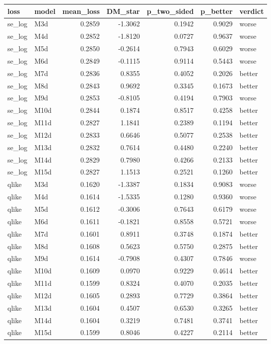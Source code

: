 \begin{tabular}{llrrrrl}
\toprule
loss & model & mean_loss & DM_star & p_two_sided & p_better & verdict \\
\midrule
se_log & M3d & 0.2859 & -1.3062 & 0.1942 & 0.9029 & worse \\
se_log & M4d & 0.2852 & -1.8120 & 0.0727 & 0.9637 & worse \\
se_log & M5d & 0.2850 & -0.2614 & 0.7943 & 0.6029 & worse \\
se_log & M6d & 0.2849 & -0.1115 & 0.9114 & 0.5443 & worse \\
se_log & M7d & 0.2836 & 0.8355 & 0.4052 & 0.2026 & better \\
se_log & M8d & 0.2843 & 0.9692 & 0.3345 & 0.1673 & better \\
se_log & M9d & 0.2853 & -0.8105 & 0.4194 & 0.7903 & worse \\
se_log & M10d & 0.2844 & 0.1874 & 0.8517 & 0.4258 & better \\
se_log & M11d & 0.2827 & 1.1841 & 0.2389 & 0.1194 & better \\
se_log & M12d & 0.2833 & 0.6646 & 0.5077 & 0.2538 & better \\
se_log & M13d & 0.2832 & 0.7614 & 0.4480 & 0.2240 & better \\
se_log & M14d & 0.2829 & 0.7980 & 0.4266 & 0.2133 & better \\
se_log & M15d & 0.2827 & 1.1513 & 0.2521 & 0.1260 & better \\
qlike & M3d & 0.1620 & -1.3387 & 0.1834 & 0.9083 & worse \\
qlike & M4d & 0.1614 & -1.5335 & 0.1280 & 0.9360 & worse \\
qlike & M5d & 0.1612 & -0.3006 & 0.7643 & 0.6179 & worse \\
qlike & M6d & 0.1611 & -0.1821 & 0.8558 & 0.5721 & worse \\
qlike & M7d & 0.1601 & 0.8911 & 0.3748 & 0.1874 & better \\
qlike & M8d & 0.1608 & 0.5623 & 0.5750 & 0.2875 & better \\
qlike & M9d & 0.1614 & -0.7908 & 0.4307 & 0.7846 & worse \\
qlike & M10d & 0.1609 & 0.0970 & 0.9229 & 0.4614 & better \\
qlike & M11d & 0.1599 & 0.8324 & 0.4070 & 0.2035 & better \\
qlike & M12d & 0.1605 & 0.2893 & 0.7729 & 0.3864 & better \\
qlike & M13d & 0.1604 & 0.4507 & 0.6530 & 0.3265 & better \\
qlike & M14d & 0.1604 & 0.3219 & 0.7481 & 0.3741 & better \\
qlike & M15d & 0.1599 & 0.8046 & 0.4227 & 0.2114 & better \\
\bottomrule
\end{tabular}
